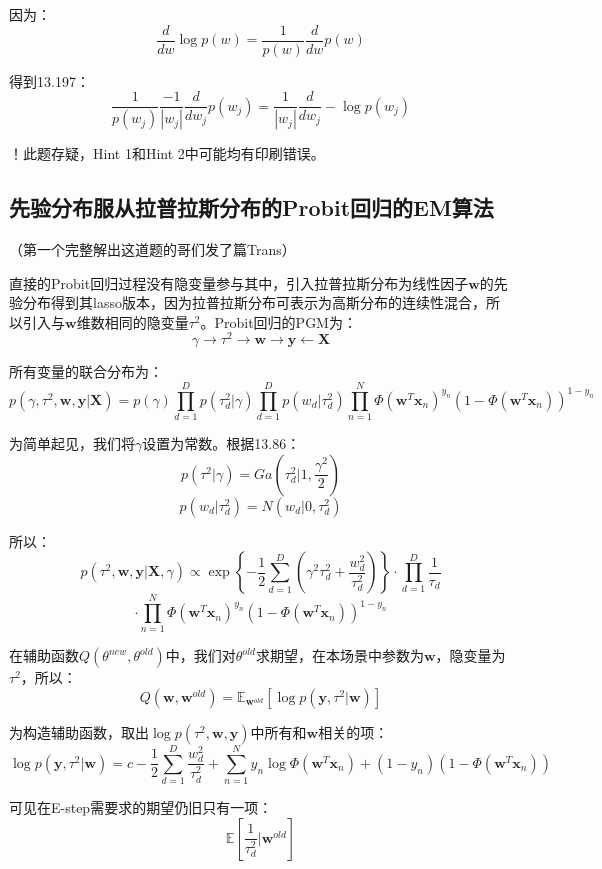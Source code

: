 \documentclass[UTF8]{ctexart}
\begin{document}
因为：
$$\frac{d}{dw} \log p(w) = \frac{1}{p(w)}\frac{d}{dw}p(w)$$

得到13.197：
$$\frac{1}{p(w_{j})}\frac{-1}{|w_{j}|}\frac{d}{dw_{j}}p(w_{j})=\frac{1}{|w_{j}|}\frac{d}{dw_{j}}-\log p(w_{j})$$

！此题存疑，Hint 1和Hint 2中可能均有印刷错误。

\subsection{先验分布服从拉普拉斯分布的Probit回归的EM算法}
（第一个完整解出这道题的哥们发了篇Trans）

直接的Probit回归过程没有隐变量参与其中，引入拉普拉斯分布为线性因子$\textbf{w}$的先验分布得到其lasso版本，因为拉普拉斯分布可表示为高斯分布的连续性混合，所以引入与$\textbf{w}$维数相同的隐变量$\tau^{2}$。Probit回归的PGM为：
$$\gamma \rightarrow \tau^{2} \rightarrow \textbf{w} \rightarrow \textbf{y} \leftarrow \textbf{X}$$

所有变量的联合分布为：
$$p(\gamma,\tau^{2},\textbf{w},\textbf{y}|\textbf{X})=p(\gamma)\prod_{d=1}^{D}p(\tau_{d}^{2}|\gamma)\prod_{d=1}^{D}p(w_{d}|\tau_{d}^{2})\prod_{n=1}^{N}\Phi(\textbf{w}^{T}\textbf{x}_{n})^{y_{n}}(1-\Phi(\textbf{w}^{T}\textbf{x}_{n}))^{1-y_{n}}$$

为简单起见，我们将$\gamma$设置为常数。根据13.86：
$$p(\tau^{2}|\gamma)=Ga(\tau_{d}^{2}|1,\frac{\gamma^{2}}{2})$$
$$p(w_{d}|\tau_{d}^{2})=N(w_{d}|0,\tau_{d}^{2})$$

所以：
$$p(\tau^{2},\textbf{w},\textbf{y}|\textbf{X},\gamma)\propto \exp\left\{ -\frac{1}{2}\sum_{d=1}^{D}(\gamma^{2}\tau_{d}^{2} + \frac{w_{d}^{2}}{\tau_{d}^{2}}) \right\}\cdot \prod_{d=1}^{D}\frac{1}{\tau_{d}}$$
$$\cdot \prod_{n=1}^{N}\Phi(\textbf{w}^{T}\textbf{x}_{n})^{y_{n}}(1-\Phi(\textbf{w}^{T}\textbf{x}_{n}))^{1-y_{n}}$$

在辅助函数$Q(\theta^{new},\theta^{old})$中，我们对$\theta^{old}$求期望，在本场景中参数为$\textbf{w}$，隐变量为$\tau^{2}$，所以：
$$Q(\textbf{w},\textbf{w}^{old})=\mathbb{E}_{\textbf{w}^{old}}[\log p(\textbf{y},\tau^{2}|\textbf{w})]$$

为构造辅助函数，取出$\log p(\tau^{2},\textbf{w},\textbf{y})$中所有和$\textbf{w}$相关的项：
$$\log p(\textbf{y},\tau^{2}|\textbf{w}) = c -\frac{1}{2}\sum_{d=1}^{D} \frac{w_{d}^{2}}{\tau_{d}^{2}} + \sum_{n=1}^{N} y_{n}\log \Phi(\textbf{w}^{T}\textbf{x}_{n}) + (1-y_{n})(1-\Phi(\textbf{w}^{T}\textbf{x}_{n}))$$

可见在E-step需要求的期望仍旧只有一项：
$$\mathbb{E}[\frac{1}{\tau_{d}^{2}}|\textbf{w}^{old}]$$
\end{document}
